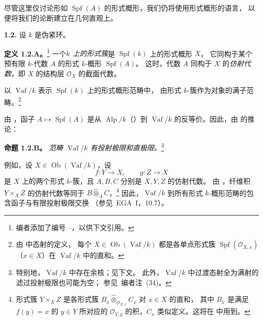 尽管这里仅讨论形如 \(\operatorname{Spf}(A)\) 的形式概形，我们仍将使用形式概形的语言，
以便将我们的论断建立在几何直观上。

\medskip
\noindent\textbf{1.2.}
\label{sga3:VIIB:1.2}
设 \(k\) 是伪紧环。

\medskip
\noindent\textbf{定义 1.2.A。}\footnote{%
\label{sga3:VIIB:nde:38}编者添加了编号 --，以供下文引用。}
\label{sga3:VIIB:1.2.A}
一个\emph{\(k\) 上的形式簇}是 \(\operatorname{Spf}(k)\) 上的形式概形 \(X\)，
它同构于某个预有限 \(k\)-代数 \(A\) 的形式 \(k\)-概形 \(\operatorname{Spf}(A)\)。
这时，代数 \(A\) 同构于 \(X\) 的\emph{仿射代数}，即 \(X\) 的结构层
\(\mathcal O_X\) 的截面代数。

以 \(\operatorname{Vaf}/k\) 表示 \(\operatorname{Spf}(k)\) 上的形式概形范畴中，
由形式 \(k\)-簇作为对象的满子范畴。\footnote{%
\label{sga3:VIIB:nde:39}由  中态射的定义，
每个 \(X\in\operatorname{Ob}(\operatorname{Vaf}/k)\) 都是各单点形式簇
\(\operatorname{Spf}(\mathcal O_{X,x})\)（\(x\in X\)）在
\(\operatorname{Vaf}/k\) 中的直和。}

由 ，函子 \(A\mapsto\operatorname{Spf}(A)\)
是从 \(\operatorname{Alp}/k\)（）到
\(\operatorname{Vaf}/k\) 的反等价。因此，由  的推论：

\medskip
\noindent\textbf{命题 1.2.B。}
\label{sga3:VIIB:1.2.B}
\textit{范畴 \(\operatorname{Vaf}/k\) 有投射极限和直极限。}\footnote{
\label{sga3:VIIB:nde:40}特别地，\(\operatorname{Vaf}/k\) 中存在余核；见下文。
此外，\(\operatorname{Vaf}/k\) 中过渡态射全为满射的滤过投射极限也可能为空；
参见\ 编者注~(34)。}

例如，设 \(X\in\operatorname{Ob}(\operatorname{Vaf}/k)\)，设
\[
  f:Y\longrightarrow X,
  \qquad
  g:Z\longrightarrow X
\]
是 \(X\) 上的两个形式 \(k\)-簇，且 \(A,B,C\) 分别是 \(X,Y,Z\) 的仿射代数。
由 ，纤维积 \(Y\times_X Z\) 的仿射代数等同于
\(B\widehat{\otimes}_A C\)，\footnote{%
\label{sga3:VIIB:nde:41}形式簇 \(Y\times_X Z\) 是各形式簇
\(B_x\widehat{\otimes}_{\mathcal O_{X,x}}C_x\) 对 \(x\in X\) 的直和，
其中 \(B_x\) 是满足 \(f(y)=x\) 的 \(y\in Y\) 所对应的
\(\mathcal O_{Y,y}\) 的积，\(C_x\) 类似定义。这将在
 中用到。}
因此，\(\operatorname{Vaf}/k\) 到所有形式 \(k\)-概形范畴的包含函子与有限投射极限交换
（参见\ EGA~I，10.7）。


